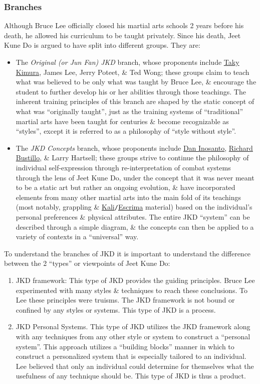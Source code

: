 \documentclass{article}
\begin{document}
\subsubsection{Branches}
Although {\sc Bruce Lee} officially closed his martial arts schools 2 years before his death, he allowed his curriculum to be taught privately. Since his death, Jeet Kune Do is argued to have split into different groups. They are:
\begin{itemize}
	\item The {\it Original (or Jun Fan) JKD} branch, whose proponents include \href{https://en.wikipedia.org/wiki/Taky_Kimura}{\sc Taky Kimura}, {\sc James Lee, Jerry Poteet, \& Ted Wong}; these groups claim to teach what was believed to be only what was taught by {\sc Bruce Lee}, \& encourage the student to further develop his or her abilities through those teachings. The inherent training principles of this branch are shaped by the static concept of what was ``originally taught'', just as the training systems of ``traditional'' martial arts have been taught for centuries \& become recognizable as ``styles'', except it is referred to as a philosophy of ``style without style''.
	\item The {\it JKD Concepts} branch, whose proponents include \href{https://en.wikipedia.org/wiki/Dan_Inosanto}{\sc Dan Inosanto}, \href{https://en.wikipedia.org/wiki/Richard_Bustillo}{\sc Richard Bustillo}, \& {\sc Larry Hartsell}; these groups strive to continue the philosophy of individual self-expression through re-interpretation of combat systems through the lens of Jeet Kune Do, under the concept that it was never meant to be a static art but rather an ongoing evolution, \& have incorporated elements from many other martial arts into the main fold of its teachings (most notably, grappling \& \href{https://en.wikipedia.org/wiki/Kali_(martial_art)}{Kali}{\tt/}\href{https://en.wikipedia.org/wiki/Escrima}{Escrima} material) based on the individual's personal preferences \& physical attributes. The entire JKD ``system'' can be described through a simple diagram, \& the concepts can then be applied to a variety of contexts in a ``universal'' way.
\end{itemize}
To understand the branches of JKD it is important to understand the difference between the 2 ``types'' or viewpoints of Jeet Kune Do:
\begin{enumerate}
	\item {\sf JKD framework}: This type of JKD provides the guiding principles. {\sc Bruce Lee} experimented with many styles \& techniques to reach these conclusions. To {\sc Lee} these principles were truisms. The JKD framework is not bound or confined by any styles or systems. This type of JKD is a process.
	\item {\sf JKD Personal Systems.} This type of JKD utilizes the JKD framework along with any techniques from any other style or system to construct a ``personal system''. This approach utilizes a ``building blocks'' manner in which to construct a personalized system that is especially tailored to an individual. {\sc Lee} believed that only an individual could determine for themselves what the usefulness of any technique should be. This type of JKD is thus a product.
\end{enumerate}
\end{document}

